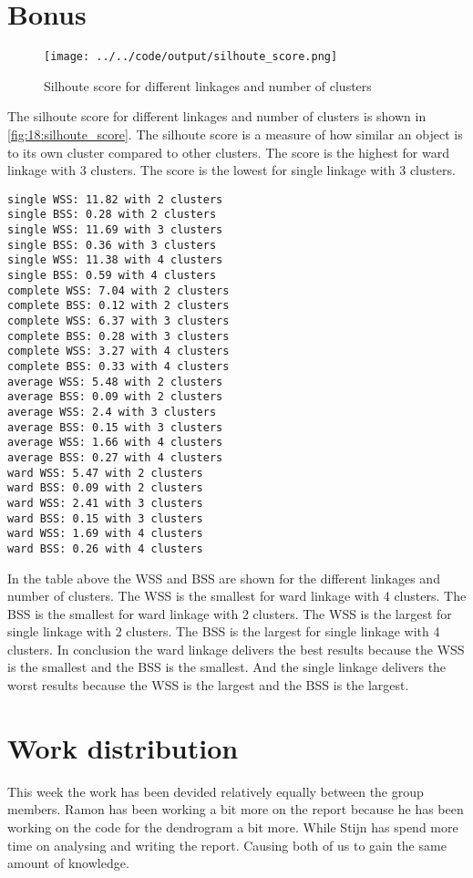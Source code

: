 \documentclass[twoside, a4paper, fleqn, reqno]{article}
\begin{document}
\section{Bonus}

\begin{figure}[H]
	\centering
	\texttt{[image: ../../code/output/silhoute\_score.png]}
	\caption{Silhoute score for different linkages and number of clusters} 
	\label{fig:18:silhoute_score}
\end{figure}

The silhoute score for different linkages and number of clusters is shown in \autoref{fig:18:silhoute_score}.
The silhoute score is a measure of how similar an object is to its own cluster compared to other clusters.
The score is the highest for ward linkage with 3 clusters.
The score is the lowest for single linkage with 3 clusters.

\newpage

\begin{verbatim}
single WSS: 11.82 with 2 clusters
single BSS: 0.28 with 2 clusters
single WSS: 11.69 with 3 clusters
single BSS: 0.36 with 3 clusters
single WSS: 11.38 with 4 clusters
single BSS: 0.59 with 4 clusters
complete WSS: 7.04 with 2 clusters
complete BSS: 0.12 with 2 clusters
complete WSS: 6.37 with 3 clusters
complete BSS: 0.28 with 3 clusters
complete WSS: 3.27 with 4 clusters
complete BSS: 0.33 with 4 clusters
average WSS: 5.48 with 2 clusters
average BSS: 0.09 with 2 clusters
average WSS: 2.4 with 3 clusters
average BSS: 0.15 with 3 clusters
average WSS: 1.66 with 4 clusters
average BSS: 0.27 with 4 clusters
ward WSS: 5.47 with 2 clusters
ward BSS: 0.09 with 2 clusters
ward WSS: 2.41 with 3 clusters
ward BSS: 0.15 with 3 clusters
ward WSS: 1.69 with 4 clusters
ward BSS: 0.26 with 4 clusters
\end{verbatim}

In the table above the WSS and BSS are shown for the different linkages and number of clusters.
The WSS is the smallest for ward linkage with 4 clusters.
The BSS is the smallest for ward linkage with 2 clusters.
The WSS is the largest for single linkage with 2 clusters.
The BSS is the largest for single linkage with 4 clusters.
In conclusion the ward linkage delivers the best results because the WSS is the smallest and the BSS is the smallest.
And the single linkage delivers the worst results because the WSS is the largest and the BSS is the largest.

\section{Work distribution}

This week the work has been devided relatively equally between the group members.
Ramon has been working a bit more on the report because he has been working on the code for the dendrogram a bit more.
While Stijn has spend more time on analysing and writing the report. Causing both of us to gain the same amount of knowledge.
\end{document}
